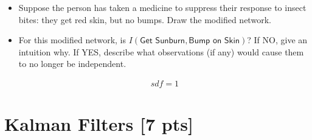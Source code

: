 \documentclass[submit]{harvardml}
\newcommand{\attr}[1]{\textsf{#1}}
\newenvironment{answer}{%
\color{answergreen}\sffamily\large}{}
\begin{document}
\begin{itemize}
    \item Suppose the person has taken a medicine to suppress their
      response to insect bites: they get red skin, but no bumps.  Draw the
      modified network.  

    \item For this modified network, is $I(\attr{Get Sunburn},\attr{Bump
      on Skin})$? If NO, give an intuition why.  If YES, describe what
      observations (if any) would cause them to no longer be independent.    

		\begin{answer}
            \begin{align}
                sdf = 1
            \end{align}
		\end{answer}
\end{itemize}



\section*{Kalman Filters [7 pts]}
\end{document}
